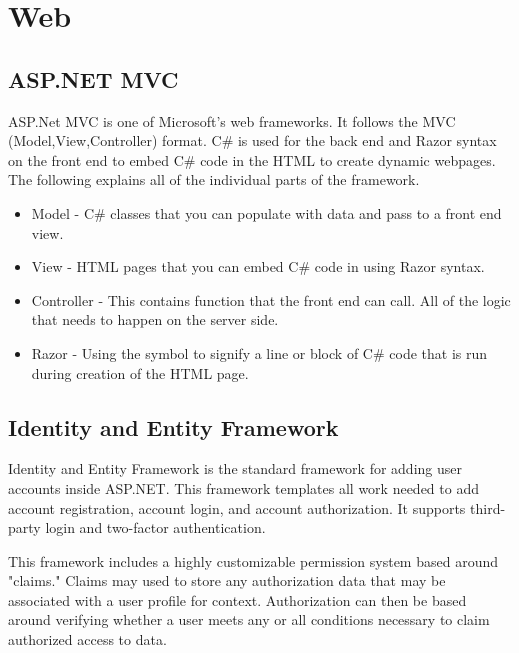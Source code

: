 
\section{Web}

\subsection{ASP.NET MVC}
ASP.Net MVC is one of Microsoft's web frameworks. It follows the MVC (Model,View,Controller) format.
C\# is used for the back end and Razor syntax on the front end to embed C\# code in the HTML to create dynamic webpages.
The following explains all of the individual parts of the framework.

\begin{itemize}
    \item Model - C\# classes that you can populate with data and pass to a front end view.
    \item View - HTML pages that you can embed C\# code in using Razor syntax.
    \item Controller - This contains function that the front end can call. All of the logic that needs to happen on the server side.
    \item Razor - Using the \@ symbol to signify a line or block of C\# code that is run during creation of the HTML page.
\end{itemize}
\subsection{Identity and Entity Framework}
Identity and Entity Framework is the standard framework for adding user accounts inside ASP.NET. This framework templates all work needed to add account registration, account login, and account authorization. It supports third-party login and two-factor authentication. 

This framework includes a highly customizable permission system based around "claims." Claims may used to store any authorization data that may be associated with a user profile for context. Authorization can then be based around verifying whether a user meets any or all conditions necessary to claim authorized access to data. 



